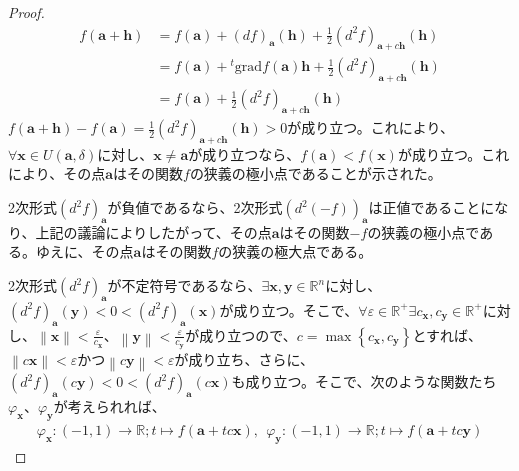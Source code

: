 \documentclass[dvipdfmx]{jsarticle}
\begin{document}
\begin{proof}
\begin{align*}
f\left( \mathbf{a} + \mathbf{h} \right) &= f\left( \mathbf{a} \right) + (df)_{\mathbf{a}}\left( \mathbf{h} \right) + \frac{1}{2}\left( d^{2}f \right)_{\mathbf{a} + c\mathbf{h}}\left( \mathbf{h} \right)\\
&= f\left( \mathbf{a} \right) +{}^t \mathrm{grad}f\left( \mathbf{a} \right)\mathbf{h} + \frac{1}{2}\left( d^{2}f \right)_{\mathbf{a} + c\mathbf{h}}\left( \mathbf{h} \right)\\
&= f\left( \mathbf{a} \right) + \frac{1}{2}\left( d^{2}f \right)_{\mathbf{a} + c\mathbf{h}}\left( \mathbf{h} \right)
\end{align*}
$f\left( \mathbf{a} + \mathbf{h} \right) - f\left( \mathbf{a} \right) = \frac{1}{2}\left( d^{2}f \right)_{\mathbf{a} + c\mathbf{h}}\left( \mathbf{h} \right) > 0$が成り立つ。これにより、$\forall\mathbf{x} \in U\left( \mathbf{a},\delta \right)$に対し、$\mathbf{x} \neq \mathbf{a}$が成り立つなら、$f\left( \mathbf{a} \right) < f\left( \mathbf{x} \right)$が成り立つ。これにより、その点$\mathbf{a}$はその関数$f$の狭義の極小点であることが示された。\par
2次形式$\left( d^{2}f \right)_{\mathbf{a}}$が負値であるなら、2次形式$\left( d^{2}( - f) \right)_{\mathbf{a}}$は正値であることになり、上記の議論によりしたがって、その点$\mathbf{a}$はその関数$- f$の狭義の極小点である。ゆえに、その点$\mathbf{a}$はその関数$f$の狭義の極大点である。\par
2次形式$\left( d^{2}f \right)_{\mathbf{a}}$が不定符号であるなら、$\exists\mathbf{x},\mathbf{y} \in \mathbb{R}^{n}$に対し、$\left( d^{2}f \right)_{\mathbf{a}}\left( \mathbf{y} \right) < 0 < \left( d^{2}f \right)_{\mathbf{a}}\left( \mathbf{x} \right)$が成り立つ。そこで、$\forall\varepsilon \in \mathbb{R}^{+}\exists c_{\mathbf{x}},c_{\mathbf{y}} \in \mathbb{R}^{+}$に対し、$\left\| \mathbf{x} \right\| < \frac{\varepsilon}{c_{\mathbf{x}}}$、$\left\| \mathbf{y} \right\| < \frac{\varepsilon}{c_{\mathbf{y}}}$が成り立つので、$c = \max\left\{ c_{\mathbf{x}},c_{\mathbf{y}} \right\}$とすれば、$\left\| c\mathbf{x} \right\| < \varepsilon$かつ$\left\| c\mathbf{y} \right\| < \varepsilon$が成り立ち、さらに、$\left( d^{2}f \right)_{\mathbf{a}}\left( c\mathbf{y} \right) < 0 < \left( d^{2}f \right)_{\mathbf{a}}\left( c\mathbf{x} \right)$も成り立つ。そこで、次のような関数たち$\varphi_{\mathbf{x}}$、$\varphi_{\mathbf{y}}$が考えられれば、
\begin{align*}
\varphi_{\mathbf{x}}:( - 1,1) \rightarrow \mathbb{R};t \mapsto f\left( \mathbf{a} + tc\mathbf{x} \right),\ \ \varphi_{\mathbf{y}}:( - 1,1) \rightarrow \mathbb{R};t \mapsto f\left( \mathbf{a} + tc\mathbf{y} \right)

\end{align*}
\end{proof}
\end{document}
